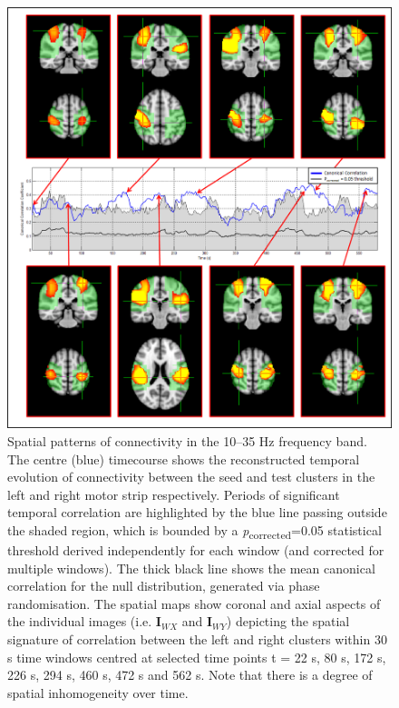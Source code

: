 \begin{figure}
	\includegraphics[width=\linewidth]{./images/chapter4/figure_8.png}\caption{Spatial patterns of connectivity in the 10–35 Hz frequency band. The centre (blue) timecourse shows the reconstructed temporal evolution of connectivity between the seed and test clusters in the left and right motor strip respectively. Periods of significant temporal correlation are highlighted by the blue line passing outside the shaded region, which is bounded by a \textit{p}\textsubscript{corrected}=0.05 statistical threshold derived independently for each window (and corrected for multiple windows). The thick black line shows the mean canonical correlation for the null distribution, generated via phase randomisation. The spatial maps show coronal and axial aspects of the individual images (i.e. $\mathbf{I}_{WX}$ and $\mathbf{I}_{WY}$) depicting the spatial signature of correlation between the left and right clusters within 30 s time windows centred at selected time points t = 22 s, 80 s, 172 s, 226 s, 294 s, 460 s, 472 s and 562 s. Note that there is a degree of spatial inhomogeneity over time.}\label{fig_4_8}
\end{figure}

